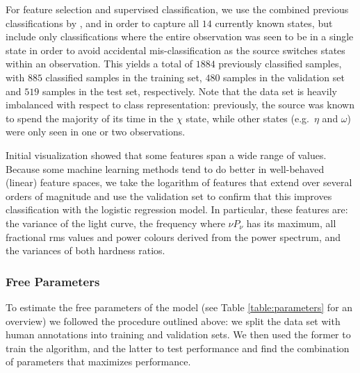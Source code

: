 \documentclass[fleqn,usenatbib]{mnras}
\begin{document}
For feature selection and supervised classification, we use the combined previous classifications by \citet{belloni2000}, \citet{kleinwolt2002} and \citet{hannikainen2003} in order to capture all $14$ currently known states, but include only classifications where the entire observation was seen to be in a single state in order to avoid accidental mis-classification as the source switches states within an observation. This yields a total of $1884$ previously classified samples, with $885$ classified samples in the training set, $480$ samples in the validation set and $519$ samples in the test set, respectively. Note that the data set is heavily imbalanced with respect to class representation: previously, the source was known to spend the majority of its time in the $\chi$ state, while other states (e.g.\ $\eta$ and $\omega$) were only seen in one or two observations. 

Initial visualization showed that some features span a wide range of values. Because some machine learning methods tend to do better in well-behaved (linear) feature spaces, we take the logarithm of features that extend over several orders of magnitude and use the validation set to confirm that this improves classification with the logistic regression model. In particular, these features are: the variance of the light curve, the frequency where $\nu P_\nu$ has its maximum, all fractional rms values and power colours derived from the power spectrum, and the variances of both hardness ratios. 

\subsubsection{Free Parameters}
\label{sec:freeparams}

To estimate the free parameters of the model (see Table \ref{table:parameters} for an overview) we followed the procedure outlined above: we split the data set with human annotations into training and validation sets. We then used the former to train the algorithm, and the latter to test performance and find the combination of parameters that maximizes performance.
\end{document}
